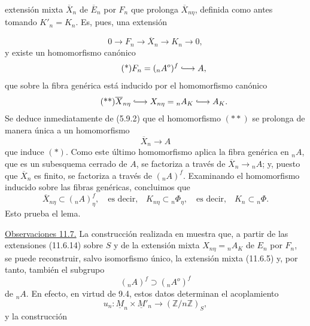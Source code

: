 
extensión mixta $\overline X_n$ de $\overline E_n$ por $F_n$ que
prolonga $\overline X_{n\eta}$, definida como antes tomando
$K'_n=K_n$. Es, pues, una extensión

\begin{equation*}
0\longrightarrow F_n\longrightarrow\overline X_n
 \longrightarrow K_n\longrightarrow0,
\end{equation*}
y existe un homomorfismo canónico
\begin{equation}\tag{*}
F_n=({}_nA^o)^f\lhook\joinrel\longrightarrow A,
\end{equation}
que sobre la fibra genérica está inducido por el homomorfismo canónico
\begin{equation}\tag{**}
\overline X_{n\eta}\lhook\joinrel\longrightarrow X_{n\eta}
 ={}_nA_K\lhook\joinrel\longrightarrow A_K.
\end{equation}
Se deduce inmediatamente de (5.9.2) que el homomorfismo $(**)$ se
prolonga de manera única a un homomorfismo
\begin{equation}\tag{***}
\overline X_n\longrightarrow A
\end{equation}
que induce $(*)$. Como este último homomorfismo aplica la fibra genérica
en ${}_nA$, que es un subesquema cerrado de $A$, se factoriza a través
de $\overline X_n\longrightarrow{}_nA$; y, puesto que $\overline X_n$
es finito, se factoriza a través de $({}_nA)^f$. Examinando el
homomorfismo inducido sobre las fibras genéricas, concluimos que
\begin{equation*}
\overline X_{n\eta}\subset({}_nA)^f_\eta,
\quad\text{es decir,}\quad
K_{n\eta}\subset{}_n\Phi_\eta,
\quad\text{es decir,}\quad
K_n\subset{}_n\Phi.
\end{equation*}
Esto prueba el lema.

\medskip
\noindent
\underline{Observaciones 11.7.} La construcción realizada en
 muestra que, a partir de las extensiones (11.6.14)
sobre $S$ y de la extensión mixta $X_{n\eta}={}_nA_K$ de $E_n$ por
$F_n$, se puede reconstruir, salvo isomorfismo único, la extensión
mixta (11.6.5) y, por tanto, también el subgrupo
\begin{equation*}
({}_nA)^f\supset({}_nA^o)^f
\end{equation*}
de ${}_nA$. En efecto, en virtud de 9.4, estos datos determinan el
acoplamiento
\begin{equation*}
u_n:\underline M_n\times\underline M'_n
 \longrightarrow(\mathbb Z/n\mathbb Z)_S,
\end{equation*}
y la construcción

